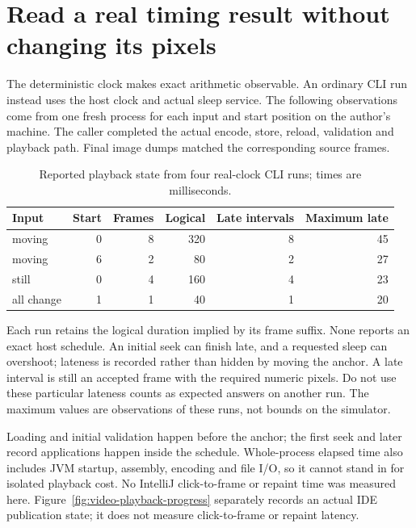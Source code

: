 \section{Read a real timing result without changing its pixels}
The deterministic clock makes exact arithmetic observable. An ordinary CLI run
instead uses the host clock and actual sleep service. The following observations
come from one fresh process for each input and start position on the author's
machine. The caller completed the actual encode, store, reload, validation and
playback path. Final image dumps matched the corresponding source frames.

\begin{table}[htbp]
  \centering
  \caption{Reported playback state from four real-clock CLI runs; times are milliseconds.}
  \label{tab:video-playback-host-observation}
  \begin{tabular}{l r r r r r}
    \toprule
    Input      & Start & Frames & Logical & Late intervals & Maximum late \\
    \midrule
    moving     & 0     & 8      & 320     & 8              & 45           \\
    moving     & 6     & 2      & 80      & 2              & 27           \\
    still      & 0     & 4      & 160     & 4              & 23           \\
    all change & 1     & 1      & 40      & 1              & 20           \\
    \bottomrule
  \end{tabular}
\end{table}

Each run retains the logical duration implied by its frame suffix. None reports
an exact host schedule. An initial seek can finish late, and a requested sleep
can overshoot; lateness is recorded rather than hidden by moving the anchor.
A late interval is still an accepted frame with the required numeric pixels.
Do not use these particular lateness counts as expected answers on another run.
The maximum values are observations of these runs, not bounds on the simulator.

Loading and initial validation happen before the anchor; the first seek and later
record applications happen inside the schedule. Whole-process elapsed time also
includes JVM startup, assembly, encoding and file I/O, so it cannot stand in for
isolated playback cost. No IntelliJ click-to-frame or repaint time was measured
here. Figure~\ref{fig:video-playback-progress} separately records an actual IDE
publication state; it does not measure click-to-frame or repaint latency.
